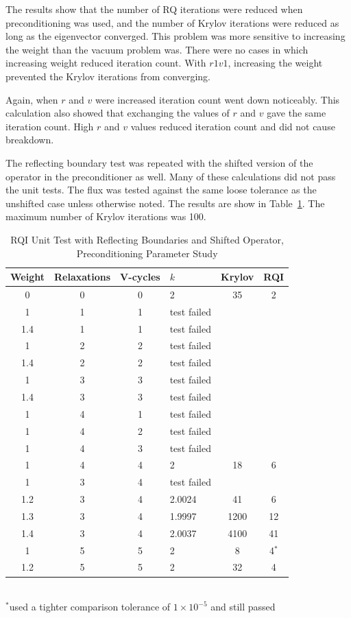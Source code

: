 The results show that the number of RQ iterations were reduced when preconditioning was used, and the number of  Krylov iterations were reduced as long as the eigenvector converged. This problem was more sensitive to increasing the weight than the vacuum problem was. There were no cases in which increasing weight reduced iteration count. With $r1v1$, increasing the weight prevented the Krylov iterations from converging. 

Again, when $r$ and $v$ were increased iteration count went down noticeably. This calculation also showed that exchanging the values of $r$ and $v$ gave the same iteration count. High $r$ and $v$ values reduced iteration count and did not cause breakdown. 

The reflecting boundary test was repeated with the shifted version of the operator in the preconditioner as well. Many of these calculations did not pass the unit tests. The flux was tested against the same loose tolerance as the unshifted case unless otherwise noted. The results are show in Table~\ref{table:RQIUnitTestReflShifted}. The maximum number of Krylov iterations was 100.
%
\begin{table}[!h]
\caption{RQI Unit Test with Reflecting Boundaries and Shifted Operator, Preconditioning Parameter Study}
\begin{center}
\begin{tabular}{c c c l c c}
\hline
Weight & Relaxations & V-cycles & $k$ & Krylov & RQI \\[0.5ex]
\hline
0    & 0 & 0 & 2 & 35 & 2 \\
1    & 1 & 1 & test failed \\
1.4 & 1 & 1 & test failed \\
1    & 2 & 2 & test failed \\
1.4 & 2 & 2 & test failed \\
1    & 3 & 3 & test failed \\
1.4 & 3 & 3 & test failed \\
1    & 4 & 1 & test failed \\
1    & 4 & 2 & test failed \\
1    & 4 & 3 & test failed \\
1    & 4 & 4 & 2 & 18 & 6 \\ 
1    & 3 & 4 & test failed \\
1.2 & 3 & 4 & 2.0024 & 41 & 6 \\
1.3 & 3 & 4 & 1.9997 & 1200 & 12 \\
1.4 & 3 & 4 & 2.0037 & 4100 & 41 \\
1    & 5 & 5 & 2 & 8 & 4$^{*}$ \\
1.2 & 5 & 5 & 2& 32 & 4 \\
\hline 
\end{tabular}\\
$^{*}$used a tighter comparison tolerance of $1 \times 10^{-5}$ and still passed
\end{center}
\label{table:RQIUnitTestReflShifted}
\end{table}

